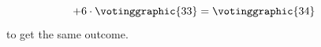 \begin{ans}{3}
\begin{equation*}
         +6\cdot\votinggraphic{33}
         = \votinggraphic{34}
       \tag*{}\end{equation*}
       to get the same outcome.
    
\end{ans}
